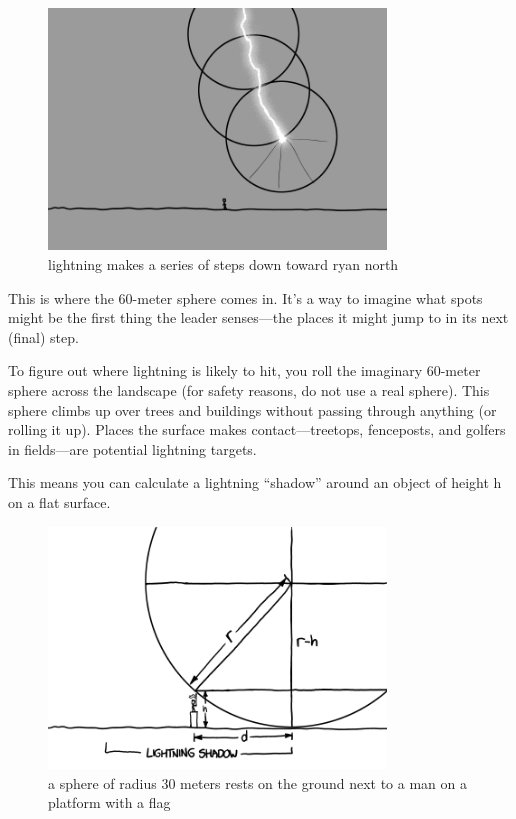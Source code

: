 \begin{figure}[!htbp]
\centering
\includegraphics[scale=0.5, max width=0.8\textwidth]{imgs/a/16/lightning_steps.png}
\caption{lightning makes a series of steps down toward ryan north}
\end{figure}

{This is where the 60-meter sphere comes in. It’s a way to imagine what spots might be the first thing the leader senses—the places it might jump to in its next (final) step.}

{To figure out where lightning is likely to hit, you roll the imaginary 60-meter sphere across the landscape (for safety reasons, do not use a real sphere). This sphere climbs up over trees and buildings without passing through anything (or rolling it up). Places the surface makes contact—treetops, fenceposts, and golfers in fields—are potential lightning targets.}

{This means you can calculate a lightning “shadow” around an object of height h on a flat surface.}

\begin{figure}[!htbp]
\centering
\includegraphics[scale=0.5, max width=0.8\textwidth]{imgs/a/16/lightning_shadow.png}
\caption{a sphere of radius 30 meters rests on the ground next to a man on a platform with a flag}
\end{figure}

